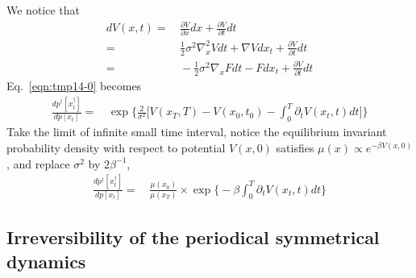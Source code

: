 \documentclass[journal=jctcce,manuscript=article]{achemso}
\newcommand{\mymu}{\mu}
\begin{document}
We notice that
\begin{align}\nonumber
  dV(x, t) = &\, \frac{\partial V}{\partial x} dx + \frac{\partial V}{\partial t} dt\\\nonumber
  =&\,
  \frac12 \sigma^2 \nabla^2_x V dt +  \nabla V dx_t + \frac{\partial V}{\partial t} dt \\
  =&\,
  -\frac12 \sigma^2 \nabla_x F dt -  F dx_t + \frac{\partial V}{\partial t} dt
\end{align}
Eq.~\eqref{eqn:tmp14-0} becomes
\begin{align}
  \frac{  dp^\dagger[x^\dagger_t] }{ dp[x_t]}
  =&\,
  \exp\bigg\{
  \frac2{\sigma^2}\bigg[
  V(x_T,T) - V(x_0,t_0) - \int_0^T\partial_tV(x_t,t)dt
  \bigg]
  \bigg\}
\end{align}
Take the limit of infinite small time interval, notice the equilibrium
invariant probability density with respect to potential $V(x,0)$ satisfies $\mymu(x) \propto e^{-\beta V(x,0)}$, and replace $\sigma^2$ by $2\beta^{-1}$,
\begin{align}
  \frac{  dp^\dagger[x^\dagger_t] }{ dp[x_t]}
  =&\,
  \frac{\mymu(x_0)}{\mymu(x_T)}\times
  \exp\bigg\{
  - \beta\int_0^T\partial_tV(x_t,t)dt
  \bigg\}
\end{align}

\subsection{Irreversibility of the periodical symmetrical dynamics}
\end{document}
